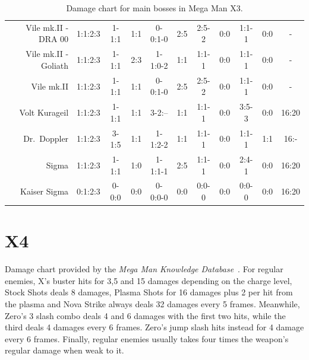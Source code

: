 \begin{table}[htp]
{\begin{tabular}{r *{10}{c}}
	Vile mk.II - DRA 00	 &	 1:1:2:3& 1-1:1& 1:1 &  0-0:1-0& 2:5& 2:5-2& 0:0& 1:1-1& 0:0& -\\
Vile mk.II - Goliath	 &	 1:1:2:3& 1-1:1& 2:3 &  1-1:0-2& 1:1& 1:1-1& 0:0& 1:1-1& 0:0& -\\
			Vile mk.II   &	 1:1:2:3& 1-1:1& 1:1 &  0-0:1-0& 2:5& 2:5-2& 0:0& 1:1-1& 0:0& -\\
		Volt Kurageil    &	 1:1:2:3& 1-1:1& 1:1 &  3-2:-- & 1:1& 1:1-1& 0:0&  3:5-3& 0:0& 16:20\\
		Dr.~Doppler   	 &	 1:1:2:3& 3-1:5& 1:1 &  1-1:2-2& 1:1& 1:1-1& 0:0&  1:1-1& 1:1& 16:-\\
		Sigma		   	 &	 1:1:2:3& 1-1:1& 1:0 &  1-1:1-1& 2:5& 1:1-1& 0:0&  2:4-1& 0:0& 16:20\\
		Kaiser Sigma	 &	 0:1:2:3& 0-0:0& 0:0 &  0-0:0-0& 0:0& 0:0-0& 0:0&  0:0-0& 0:0& 16:20\\
		\bottomrule
		\end{tabular}
	}	
	\caption{Damage chart for main bosses in Mega Man X3.}
\end{table}


\section{X4}
Damage chart provided by the \emph{Mega Man Knowledge Database}~\cite{wiki:X4_damage_chart_X,wiki:X4_damage_chart_Z}. 
For regular enemies, X's buster hits for 3,5 and 15 damages depending on the charge level, Stock Shots deals 8 damages, 
Plasma Shots for 16 damages plus 2 per hit from the plasma and
Nova Strike always deals 32 damages every 5 frames. Meanwhile, Zero's 3 slash combo deals 4 and 6 damages with the first two hits, while the third deals 4 damages every 6 frames. Zero's jump slash hits instead for 4 damage every 6 frames. Finally, regular enemies usually takes four times the weapon's regular damage when weak to it.

